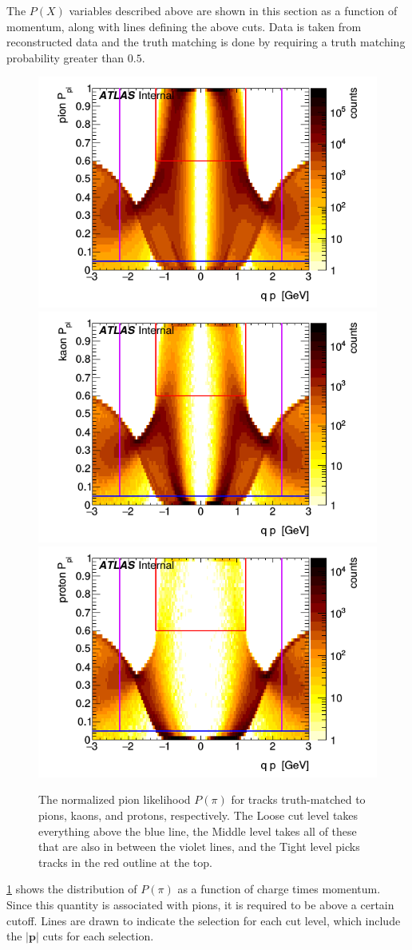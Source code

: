 The $P(X)$ variables described above are shown in this section as a function of momentum, along with lines defining the above cuts.
Data is taken from reconstructed \Hijing \pPb data and the truth matching is done by requiring a truth matching probability greater than $0.5$.

\begin{figure}[t]
\begin{minipage}[t]{1.0\textwidth}
\centering
\includegraphics[width=.32\linewidth]{P_pion_pi.png}
\includegraphics[width=.32\linewidth]{P_kaon_pi.png}
\includegraphics[width=.32\linewidth]{P_proton_pi.png}
\end{minipage}
\caption{The normalized pion likelihood $P(\pi)$ for tracks truth-matched to pions, kaons, and protons, respectively. The Loose cut level takes everything above the blue line, the Middle level takes all of these that are also in between the violet lines, and the Tight level picks tracks in the red outline at the top.}
\label{fig:prob_pi}
\end{figure}

\cref{fig:prob_pi} shows the distribution of $P(\pi)$ as a function of charge times momentum.
Since this quantity is associated with pions, it is required to be above a certain cutoff.
Lines are drawn to indicate the selection for each cut level, which include the $\left|\mathbf{p}\right|$ cuts for each selection.


